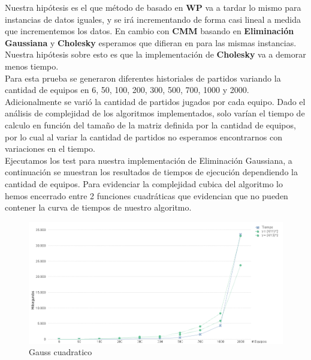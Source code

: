 Nuestra hipótesis es el que método de basado en \textbf{WP} va a tardar lo mismo para instancias de datos iguales, y se irá incrementando de forma casi lineal a medida que
incrementemos los datos. En cambio con \textbf{CMM} basando en \textbf{Eliminación Gaussiana} y \textbf{Cholesky} esperamos que difieran en para las mismas instancias.
Nuestra hipótesis sobre esto es que la implementación de \textbf{Cholesky} va a demorar menos tiempo. \\

Para esta prueba se generaron diferentes historiales de partidos variando la cantidad de equipos en 6, 50, 100, 200, 300, 500, 700, 1000 y 2000. \\

Adicionalmente se varió la cantidad de partidos jugados por cada equipo. Dado el análisis de complejidad de los algoritmos implementados, solo varían el tiempo de calculo en
función del tamaño de la matriz definida por la cantidad de equipos, por lo cual al variar la cantidad de partidos no esperamos encontrarnos con variaciones en el tiempo. \\

Ejecutamos los test para nuestra implementación de Eliminación Gaussiana, a continuación se muestran los resultados de tiempos de ejecución dependiendo la cantidad de equipos.
Para evidenciar la complejidad cubica del algoritmo lo hemos encerrado entre 2 funciones cuadráticas que evidencian que no pueden contener la curva de tiempos de nuestro algoritmo. \\

\begin{figure}[H]
    \centering
    \includegraphics[width=1\textwidth]{IMG/gauss cuadrativo.png}
    \caption{Gauss cuadratico}
    \label{fig:Gauss cuadratico}
\end{figure}

\\

